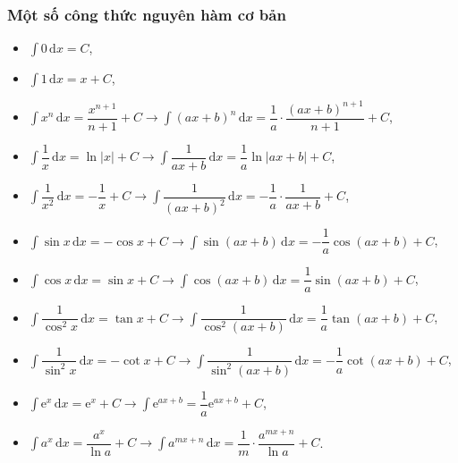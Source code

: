 \begin{khung}
			\subsubsection{Một số công thức nguyên hàm cơ bản}
			\begin{itemize}
		\item $\displaystyle\int 0 \mathrm{\,d}x = C$,
		\item $\displaystyle\int 1 \mathrm{\,d}x = x+C$,
		\item $\displaystyle\int x^{n}\mathrm{\,d}x = \dfrac{x^{n+1}}{n+1}+C \longrightarrow \displaystyle\int \left(ax+b\right)^{n}\mathrm{\,d}x = \dfrac {1}{a} \cdot \dfrac{\left(ax+b\right)^{n+1}}{n+1}+C$,
		\item $\displaystyle\int \dfrac{1}{x}\mathrm{\,d}x = \ln \left|x\right|+C \longrightarrow \displaystyle\int \dfrac{1}{ax+b}\mathrm{\,d}x = \dfrac {1}{a} \ln \left|ax+b\right|+C$,
		\item $\displaystyle\int \dfrac{1}{x^2}\mathrm{\,d}x =-\dfrac{1}{x}+C \longrightarrow \displaystyle\int \dfrac{1}{\left(ax+b\right)^2}\mathrm{\,d}x = -\dfrac {1}{a} \cdot \dfrac{1}{ax+b}+C$,
		\item $\displaystyle\int \sin {x} \mathrm{\,d}x = -\cos {x}+C \longrightarrow \displaystyle\int \sin {\left(ax+b\right)}\mathrm{\,d}x = -\dfrac {1}{a} \cos {\left(ax+b\right)}+C$,
		\item $\displaystyle\int \cos {x} \mathrm{\,d}x = \sin {x}+C \longrightarrow \displaystyle\int \cos {\left(ax+b\right)}\mathrm{\,d}x = \dfrac {1}{a} \sin {\left(ax+b\right)}+C$,
		\item $\displaystyle\int \dfrac{1}{\cos^2 {x}} \mathrm{\,d}x = \tan {x}+C \longrightarrow \displaystyle\int \dfrac{1}{\cos^2 {\left(ax+b\right)}}\mathrm{\,d}x = \dfrac {1}{a} \tan {\left(ax+b\right)}+C$,
		\item $\displaystyle\int \dfrac{1}{\sin^2 {x}} \mathrm{\,d}x = -\cot {x}+C \longrightarrow \displaystyle\int \dfrac{1}{\sin^2 {\left(ax+b\right)}}\mathrm{\,d}x =- \dfrac {1}{a} \cot {\left(ax+b\right)}+C$,
		\item $\displaystyle\int \mathrm{e}^x \mathrm{\,d}x = \mathrm{e}^x+C \longrightarrow \displaystyle\int \mathrm{e}^{ax+b} = \dfrac {1}{a} \mathrm{e}^{ax+b}+C$,
		\item $\displaystyle\int a^x \mathrm{\,d}x = \dfrac{a^x}{\ln {a}}+C \longrightarrow \displaystyle\int a^{mx+n} \mathrm{\,d}x = \dfrac {1}{m} \cdot \dfrac{a^{mx+n}}{\ln {a}}+C$.
		\end{itemize}
\end{khung}
